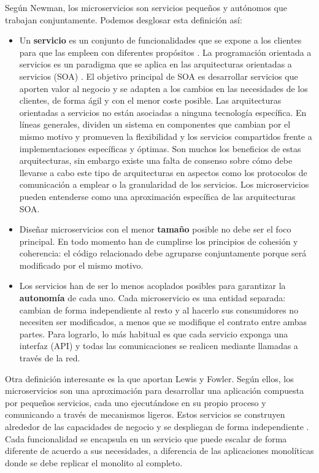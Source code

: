 \documentclass[11pt,spanish,listoffigures]{tfgetsinf}
\begin{document}
Según Newman, \cite{Newman2015a} los microservicios son servicios pequeños y autónomos que trabajan conjuntamente. Podemos desglosar esta definición así:

\begin{itemize}

\item Un \textbf{servicio} es un conjunto de funcionalidades que se expone a los clientes para que las empleen con diferentes propósitos \cite{Wikipedia}. La programación orientada a servicios es un paradigma que se aplica en las arquitecturas orientadas a servicios (SOA) \cite{Arsanjani2009a}. El objetivo principal de SOA es desarrollar servicios que aporten valor al negocio y se adapten a los cambios en las necesidades de los clientes, de forma ágil y con el menor coste posible. Las arquitecturas orientadas a servicios no están asociadas a ninguna tecnología específica. En líneas generales, dividen un sistema en componentes que cambian por el mismo motivo y promueven la flexibilidad y los servicios compartidos frente a implementaciones específicas y óptimas. Son muchos los beneficios de estas arquitecturas, sin embargo existe una falta de consenso sobre cómo debe llevarse a cabo este tipo de arquitecturas en aspectos como los protocolos de comunicación a emplear o la granularidad de los servicios. Los microservicios pueden entenderse como una aproximación específica de las arquitecturas SOA.

\item Diseñar microservicios con el menor \textbf{tamaño} posible no debe ser el foco principal. En todo momento han de cumplirse los principios de cohesión y coherencia: el código relacionado debe agruparse conjuntamente porque será modificado por el mismo motivo.

\item  Los servicios han de ser lo menos acoplados posibles para garantizar la \textbf{autonomía} de cada uno. Cada microservicio es una entidad separada: cambian de forma independiente al resto y al hacerlo sus consumidores no necesiten ser modificados, a menos que se modifique el contrato entre ambas partes. Para lograrlo, lo más habitual es que cada servicio exponga una interfaz (API) y todas las comunicaciones se realicen mediante llamadas a través de la red.

\end{itemize}

Otra definición interesante es la que aportan Lewis y Fowler. Según ellos, los microservicios son una aproximación para desarrollar una aplicación compuesta por pequeños servicios, cada uno ejecutándose en su propio proceso y comunicando a través de mecanismos ligeros. Estos servicios se construyen alrededor de las capacidades de negocio y se despliegan de forma independiente \cite{Lewis2014}. Cada funcionalidad se encapsula en un servicio que puede escalar de forma diferente de acuerdo a sus necesidades, a diferencia de las aplicaciones monolíticas donde se debe replicar el monolito al completo.
\end{document}
